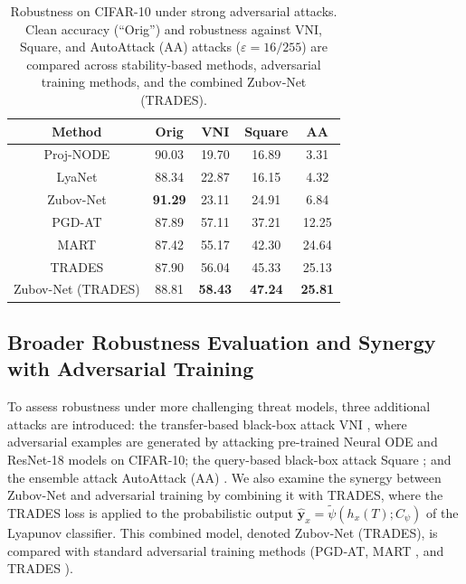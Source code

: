\documentclass[journal]{IEEEtran}
\begin{document}
\begin{table}[!t]
	\centering
	\caption{Robustness on CIFAR-10 under strong adversarial attacks. Clean accuracy (“Orig”) and robustness against VNI, Square, and AutoAttack (AA) attacks ($\varepsilon=16/255$) are compared across stability-based methods, adversarial training methods, and the combined Zubov‑Net (TRADES).} 
	\label{table:extend_attack}
	\begin{tabular}{ccccc}
		\toprule
		\textbf{Method}   & \textbf{Orig} & \textbf{VNI} & \textbf{Square}  & \textbf{AA} \\ \midrule
		Proj-NODE         & 90.03         & 19.70        & 16.89                  & 3.31        \\
		LyaNet            & 88.34         & 22.87        & 16.15                 & 4.32        \\
		Zubov-Net         & \textbf{91.29}         & 23.11        & 24.91                  & 6.84        \\
		PGD-AT            & 87.89         & 57.11        & 37.21                 & 12.25       \\
		MART              & 87.42         & 55.17        & 42.30                & 24.64       \\
		TRADES            & 87.90         & 56.04        & 45.33                & 25.13       \\
		Zubov-Net (TRADES) & 88.81         & \textbf{58.43}        & \textbf{47.24}             &\textbf{ 25.81 }     \\ \bottomrule
	\end{tabular}
	\vspace{-10pt}
\end{table}

\subsection{Broader Robustness Evaluation and Synergy with Adversarial Training}


To assess robustness under more challenging threat models, three additional attacks are introduced: the transfer-based black-box attack VNI \cite{9578612}, where adversarial examples are generated by attacking pre-trained Neural ODE and ResNet-18 models on CIFAR-10; the query-based black-box attack Square \cite{10.1007/978-3-030-58592-1_29}; and the ensemble attack AutoAttack (AA) \cite{pmlr-v119-croce20b}. We also examine the synergy between Zubov-Net and adversarial training by combining it with TRADES, where the TRADES loss is applied to the probabilistic output $\hat{\mathbf{y}}_x = \tilde{\psi}(h_x(T); C_\psi)$ of the Lyapunov classifier. This combined model, denoted Zubov‑Net (TRADES), is compared with standard adversarial training methods (PGD‑AT, MART \cite{Wang2020Improving}, and TRADES \cite{pmlr-v97-zhang19p}).
\end{document}
